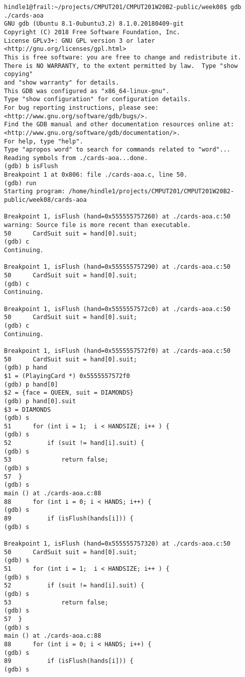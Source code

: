 \documentclass[11pt]{article}
\begin{document}
\begin{verbatim}
hindle1@frail:~/projects/CMPUT201/CMPUT201W20B2-public/week08$ gdb ./cards-aoa 
GNU gdb (Ubuntu 8.1-0ubuntu3.2) 8.1.0.20180409-git
Copyright (C) 2018 Free Software Foundation, Inc.
License GPLv3+: GNU GPL version 3 or later <http://gnu.org/licenses/gpl.html>
This is free software: you are free to change and redistribute it.
There is NO WARRANTY, to the extent permitted by law.  Type "show copying"
and "show warranty" for details.
This GDB was configured as "x86_64-linux-gnu".
Type "show configuration" for configuration details.
For bug reporting instructions, please see:
<http://www.gnu.org/software/gdb/bugs/>.
Find the GDB manual and other documentation resources online at:
<http://www.gnu.org/software/gdb/documentation/>.
For help, type "help".
Type "apropos word" to search for commands related to "word"...
Reading symbols from ./cards-aoa...done.
(gdb) b isFlush
Breakpoint 1 at 0x806: file ./cards-aoa.c, line 50.
(gdb) run
Starting program: /home/hindle1/projects/CMPUT201/CMPUT201W20B2-public/week08/cards-aoa 

Breakpoint 1, isFlush (hand=0x555555757260) at ./cards-aoa.c:50
warning: Source file is more recent than executable.
50	    CardSuit suit = hand[0].suit;
(gdb) c
Continuing.

Breakpoint 1, isFlush (hand=0x555555757290) at ./cards-aoa.c:50
50	    CardSuit suit = hand[0].suit;
(gdb) c
Continuing.

Breakpoint 1, isFlush (hand=0x5555557572c0) at ./cards-aoa.c:50
50	    CardSuit suit = hand[0].suit;
(gdb) c
Continuing.

Breakpoint 1, isFlush (hand=0x5555557572f0) at ./cards-aoa.c:50
50	    CardSuit suit = hand[0].suit;
(gdb) p hand
$1 = (PlayingCard *) 0x5555557572f0
(gdb) p hand[0]
$2 = {face = QUEEN, suit = DIAMONDS}
(gdb) p hand[0].suit
$3 = DIAMONDS
(gdb) s
51	    for (int i = 1;  i < HANDSIZE; i++ ) {
(gdb) s
52	        if (suit != hand[i].suit) {
(gdb) s
53	            return false;
(gdb) s
57	}
(gdb) s
main () at ./cards-aoa.c:88
88	    for (int i = 0; i < HANDS; i++) {
(gdb) s
89	        if (isFlush(hands[i])) {
(gdb) s

Breakpoint 1, isFlush (hand=0x555555757320) at ./cards-aoa.c:50
50	    CardSuit suit = hand[0].suit;
(gdb) s
51	    for (int i = 1;  i < HANDSIZE; i++ ) {
(gdb) s
52	        if (suit != hand[i].suit) {
(gdb) s
53	            return false;
(gdb) s
57	}
(gdb) s
main () at ./cards-aoa.c:88
88	    for (int i = 0; i < HANDS; i++) {
(gdb) s
89	        if (isFlush(hands[i])) {
(gdb) s


\end{verbatim}
\end{document}
